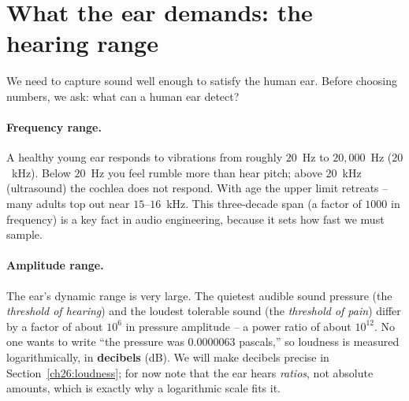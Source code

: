 \section{What the ear demands: the hearing range}
\label{ch26:hearing}

We need to capture sound well enough to satisfy the human ear. Before choosing numbers, we ask: what can a human ear detect?

\paragraph{Frequency range.} A healthy young ear responds to vibrations from roughly $20$~Hz to
$20{,}000$~Hz ($20$~kHz). Below $20$~Hz you feel rumble more than hear pitch; above $20$~kHz
(ultrasound) the cochlea does not respond. With age the upper limit retreats -- many
adults top out near $15$--$16$~kHz. This three-decade span (a factor of $1000$ in frequency) is
a key fact in audio engineering, because it sets how fast we must sample.

\paragraph{Amplitude range.} The ear's dynamic range is very large. The quietest audible sound
pressure (the \emph{threshold of hearing}) and the loudest tolerable sound (the
\emph{threshold of pain}) differ by a factor of about $10^6$ in pressure amplitude -- a power
ratio of about $10^{12}$. No one wants to write ``the pressure was $0.0000063$ pascals,'' so
loudness is measured logarithmically, in \textbf{decibels} (dB). We will make decibels precise in
Section~\ref{ch26:loudness}; for now note that the ear hears \emph{ratios}, not absolute
amounts, which is exactly why a logarithmic scale fits it.

